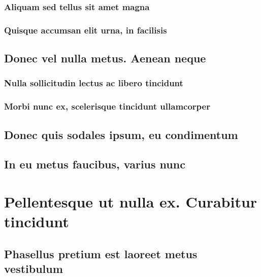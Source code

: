 \documentclass[bachelor, english, debug]{student}
\begin{document}
\lipsum[1-8]

\subsubsection{Aliquam sed tellus sit amet magna}

\lipsum[1-8]

\subsubsection{Quisque accumsan elit urna, in facilisis}

\lipsum[1-8]

\subsection{Donec vel nulla metus. Aenean neque}

\lipsum[1-8]

\subsubsection{Nulla sollicitudin lectus ac libero tincidunt}

\lipsum[1-8]

\subsubsection{Morbi nunc ex, scelerisque tincidunt ullamcorper}

\lipsum[1-8]

\subsection{Donec quis sodales ipsum, eu condimentum}

\lipsum[1-8]

\subsection{In eu metus faucibus, varius nunc}

\lipsum[1-8]

\section{Pellentesque ut nulla ex. Curabitur tincidunt}

\lipsum[1-8]

\subsection{Phasellus pretium est laoreet metus vestibulum}
\end{document}
